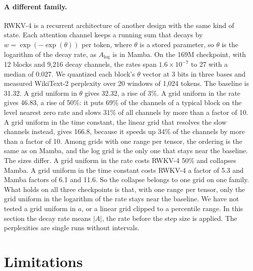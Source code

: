 \documentclass[10pt]{article}
\begin{document}
\paragraph{A different family.} RWKV-4 \citep{peng2023rwkv} is a recurrent architecture of
another design with the same kind of state. Each attention channel keeps a running sum that
decays by $w = \exp(-\exp(\theta))$ per token, where $\theta$ is a stored parameter, so $\theta$
is the logarithm of the decay rate, as $A_{\log}$ is in Mamba. On the 169M checkpoint, with 12
blocks and 9{,}216 decay channels, the rates span $1.6\times10^{-7}$ to 27 with a median of
0.027. We quantized each block's $\theta$ vector at 3 bits in three bases and measured WikiText-2
perplexity over 20 windows of 1{,}024 tokens. The baseline is 31.32. A grid uniform in $\theta$
gives 32.32, a rise of 3\%. A grid uniform in the rate gives 46.83, a rise of 50\%: it puts 69\%
of the channels of a typical block on the level nearest zero rate and slows 31\% of all channels
by more than a factor of 10. A grid uniform in the time constant, the linear grid that resolves
the slow channels instead, gives 166.8, because it speeds up 34\% of the channels by more than a
factor of 10. Among grids with one range per tensor, the ordering is the same as on Mamba, and the log
grid is the only one that stays near the baseline. The sizes differ. A grid uniform in the rate
costs RWKV-4 50\% and collapses Mamba. A grid uniform in the time constant costs RWKV-4 a factor
of 5.3 and Mamba factors of 6.1 and 11.6. So the collapse belongs to one grid on one family.
What holds on all three checkpoints is that, with one range per tensor, only the grid uniform in
the logarithm of the rate stays near the baseline. We have not tested a grid uniform in $a$, or a linear grid clipped to a percentile range. In
this section the decay rate means $|A|$, the rate before the step size is applied. The
perplexities are single runs without intervals.

\section{Limitations}\label{sec:limits}
\end{document}
